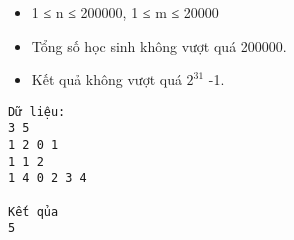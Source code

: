 \begin{itemize}
	\item     1 ≤ n ≤ 200000, 1 ≤ m ≤ 20000   
	\item     Tổng số học sinh không vượt quá 200000.   
	\item     Kết quả không vượt quá $2^{31}$    -1.   
\end{itemize}
\begin{verbatim}
Dữ liệu:
3 5
1 2 0 1
1 1 2
1 4 0 2 3 4

Kết qủa
5
\end{verbatim}